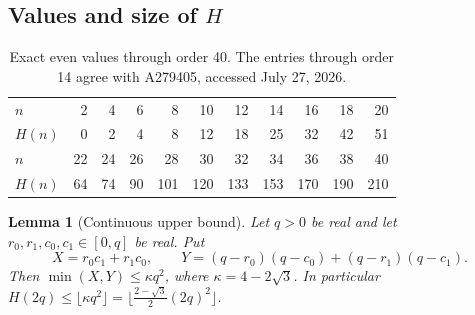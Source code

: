 \documentclass[11pt]{amsart}
\newtheorem{lemma}[theorem]{Lemma}
\theoremstyle{definition}
\theoremstyle{remark}
\begin{document}
\subsection{Values and size of \texorpdfstring{$H$}{H}}

\begin{table}[ht]
\centering\small
\begin{tabular}{@{}l*{10}{r}@{}}
\toprule
$n$      & 2 & 4 & 6 & 8 & 10 & 12 & 14 & 16 & 18 & 20\\
$H(n)$   & 0 & 2 & 4 & 8 & 12 & 18 & 25 & 32 & 42 & 51\\
\midrule
$n$      & 22 & 24 & 26 & 28 & 30 & 32 & 34 & 36 & 38 & 40\\
$H(n)$   & 64 & 74 & 90 & 101 & 120 & 133 & 153 & 170 & 190 & 210\\
\bottomrule
\end{tabular}
\medskip
\caption{Exact even values through order 40.  The entries through order 14
agree with A279405, accessed July 27, 2026.}\label{tab:Hvals}
\end{table}

\begin{lemma}[Continuous upper bound]\label{lem:Hupper}
Let $q>0$ be real and let $r_0,r_1,c_0,c_1\in[0,q]$ be real. Put
\[
X=r_0c_1+r_1c_0,\qquad Y=(q-r_0)(q-c_0)+(q-r_1)(q-c_1).
\]
Then $\min(X,Y)\le\kappa q^2$, where $\kappa=4-2\sqrt3$. In particular $H(2q)\le\lfloor\kappa q^2\rfloor=\bigl\lfloor\tfrac{2-\sqrt3}{2}(2q)^2\bigr\rfloor$.
\end{lemma}
\end{document}
